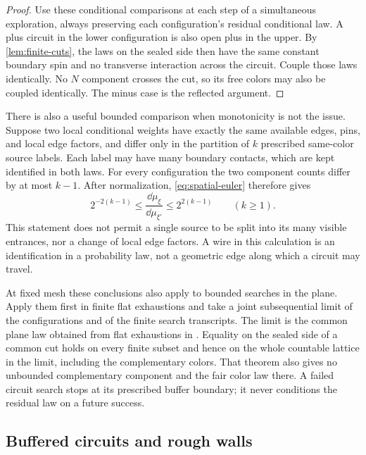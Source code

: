 \begin{proof}
Use these conditional comparisons at each step of a simultaneous
exploration, always preserving each configuration's residual
conditional law. A plus circuit in the lower configuration is also
open plus in the upper. By \cref{lem:finite-cuts}, the laws on the
sealed side then have the same constant boundary spin and no
transverse interaction across the circuit. Couple those laws
identically. No $N$ component crosses the cut, so its free colors may
also be coupled identically. The minus case is the reflected argument.
\end{proof}

There is also a useful bounded comparison when monotonicity is not the
issue. Suppose two local conditional weights have exactly the same
available edges, pins, and local edge factors, and differ only in the
partition of $k$ prescribed same-color source labels. Each label may
have many boundary contacts, which are kept identified in both laws.
For every configuration the two component counts differ by at most
$k-1$. After normalization, \eqref{eq:spatial-euler} therefore gives
\begin{equation}\label{eq:spatial-wire-density}
  2^{-2(k-1)}\le \frac{\dd\mu_\xi}{\dd\mu_{\xi'}}
                     \le 2^{2(k-1)} \qquad (k\ge1).
\end{equation}
This statement does not permit a single source to be split into its
many visible entrances, nor a change of local edge factors. A wire in
this calculation is an identification in a probability law, not a
geometric edge along which a circuit may travel.

At fixed mesh these conclusions also apply to bounded searches in the
plane. Apply them first in finite flat exhaustions and take a joint
subsequential limit of the configurations and of the finite search
transcripts. The limit is the common plane law obtained from flat
exhaustions in \cite[Theorem~17.1]{DKLM2026}. Equality on the sealed side
of a common
cut holds on every finite subset and hence on the whole countable
lattice in the limit, including the complementary colors. That theorem
also gives no unbounded complementary component and the fair color law
there. A failed circuit search stops at its prescribed buffer boundary;
it never conditions the residual law on a future success.

\subsection{Buffered circuits and rough walls}

